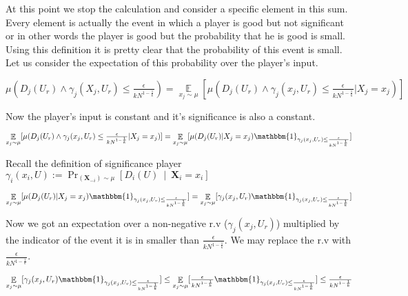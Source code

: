 \documentclass{article}
\newcommand{\coloneq}{:=}
\newcommand{\given}{\medspace \middle| \medspace}
\newcommand{\rv}[1]{\mathbf{#1}}
\theoremstyle{plain}
\begin{document}
At this point we stop the calculation and consider a specific element in this sum. Every element is actually the event in which a player is good but not significant or in other words the player is good but the probability that he is good is small. Using this definition it is pretty clear that the probability of this event is small. \newline
Let us consider the expectation of this probability over the player's input. \newline

$\mu(D_j(U_r) \land \gamma_j(X_j, U_r) \leq \frac{\epsilon}{kN^{1-\frac{1}{k}}}) = \underset{x_j \sim \mu}{\mathop{\mathbb{E}}}[\mu(D_j(U_r) \land \gamma_j(x_j, U_r) \leq \frac{\epsilon}{kN^{1-\frac{1}{k}}} | X_j = x_j)]$ \newline

Now the player's input is constant and it's significance is also a constant. \newline

$\underset{x_j \sim \mu}{\mathop{\mathbb{E}}}[\mu(D_j(U_r) \land \gamma_j(x_j, U_r) \leq \frac{\epsilon}{kN^{1-\frac{1}{k}}} | X_j = x_j)] = \underset{x_j \sim \mu}{\mathop{\mathbb{E}}}[\mu(D_j(U_r) | X_j = x_j) \mathbbm{1}_{\gamma_j(x_j, U_r) \leq \frac{\epsilon}{kN^{1-\frac{1}{k}}}}]$ \newline

Recall the definition of significance player $\gamma_i(x_i, U) \coloneq \Pr_{(\rv{X}_{-i}) \sim \mu}\left[D_i (U) \given \rv{X}_i = x_i \right]$ \newline

$\underset{x_j \sim \mu}{\mathop{\mathbb{E}}}[\mu(D_j(U_r) | X_j = x_j) \mathbbm{1}_{\gamma_j(x_j, U_r) \leq \frac{\epsilon}{kN^{1-\frac{1}{k}}}}] = \underset{x_j \sim \mu}{\mathop{\mathbb{E}}}[\gamma_j(x_j, U_r) \mathbbm{1}_{\gamma_j(x_j, U_r) \leq \frac{\epsilon}{kN^{1-\frac{1}{k}}}}]$ \newline

Now we got an expectation over a non-negative r.v ($\gamma_j(x_j, U_r)$) multiplied by the indicator of the event it is in smaller than $\frac{\epsilon}{kN^{1-\frac{1}{k}}}$. We may replace the r.v with $\frac{\epsilon}{kN^{1-\frac{1}{k}}}$. \newline

$\underset{x_j \sim \mu}{\mathop{\mathbb{E}}}[\gamma_j(x_j, U_r) \mathbbm{1}_{\gamma_j(x_j, U_r) \leq \frac{\epsilon}{kN^{1-\frac{1}{k}}}}] \leq \underset{x_j \sim \mu}{\mathop{\mathbb{E}}}[\frac{\epsilon}{kN^{1-\frac{1}{k}}} \mathbbm{1}_{\gamma_j(x_j, U_r) \leq \frac{\epsilon}{kN^{1-\frac{1}{k}}}}] \leq \frac{\epsilon}{kN^{1-\frac{1}{k}}}$ \newline
\end{document}
